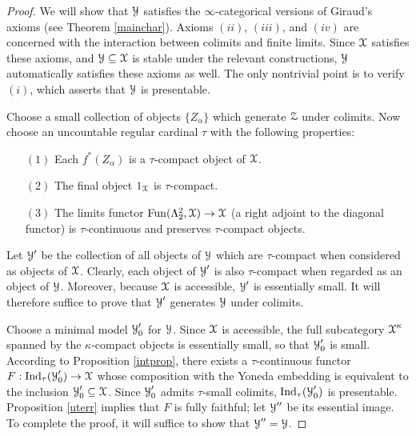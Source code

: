\begin{proof}
We will show that $\operatorname{\mathcal{Y}}$ satisfies the $\infty$-categorical versions of Giraud's axioms (see
Theorem \ref{mainchar}). Axioms $(ii)$, $(iii)$, and $(iv)$ are concerned with the interaction between colimits and finite limits. Since $\operatorname{\mathcal{X}}$ satisfies these axioms, and $\operatorname{\mathcal{Y}} \subseteq \operatorname{\mathcal{X}}$ is stable under the relevant constructions, $\operatorname{\mathcal{Y}}$ automatically satisfies these axioms as well. The only nontrivial point is to verify $(i)$, which asserts that $\operatorname{\mathcal{Y}}$ is presentable. 

Choose a small collection of objects $\{ Z_{\alpha} \}$ which generate $\operatorname{\mathcal{Z}}$ under colimits.
Now choose an uncountable regular cardinal $\tau$ with the following properties:

\begin{itemize}
\item[$(1)$] Each $f^{\ast}(Z_{\alpha})$ is a $\tau$-compact object of $\operatorname{\mathcal{X}}$.
\item[$(2)$] The final object $1_{\operatorname{\mathcal{X}}}$ is $\tau$-compact.
\item[$(3)$] The limits functor $\operatorname{Fun}(\Lambda^2_2, \operatorname{\mathcal{X}}) \rightarrow \operatorname{\mathcal{X}}$
(a right adjoint to the diagonal functor) is $\tau$-continuous and preserves $\tau$-compact objects.
\end{itemize}

Let $\operatorname{\mathcal{Y}}'$ be the collection of all objects of $\operatorname{\mathcal{Y}}$ which are $\tau$-compact when considered as objects of $\operatorname{\mathcal{X}}$. Clearly, each object of $\operatorname{\mathcal{Y}}'$ is also $\tau$-compact when regarded as an object of $\operatorname{\mathcal{Y}}$. Moreover, because $\operatorname{\mathcal{X}}$ is accessible, $\operatorname{\mathcal{Y}}'$ is essentially small. It will therefore suffice to prove that $\operatorname{\mathcal{Y}}'$ generates $\operatorname{\mathcal{Y}}$ under colimits.

Choose a minimal model $\operatorname{\mathcal{Y}}'_0$ for $\operatorname{\mathcal{Y}}$. Since $\operatorname{\mathcal{X}}$ is accessible, the full subcategory $\operatorname{\mathcal{X}}^{\kappa}$ spanned by the $\kappa$-compact objects is essentially small, so that $\operatorname{\mathcal{Y}}'_0$ is small. According to Proposition \ref{intprop}, there exists a $\tau$-continuous functor
$F: \operatorname{Ind}_{\tau}( \operatorname{\mathcal{Y}}'_{0} ) \rightarrow \operatorname{\mathcal{X}}$ whose composition with the Yoneda embedding
is equivalent to the inclusion $\operatorname{\mathcal{Y}}'_0 \subseteq \operatorname{\mathcal{X}}$. Since $\operatorname{\mathcal{Y}}'_0$ admits $\tau$-small colimits, $\operatorname{Ind}_{\tau}( \operatorname{\mathcal{Y}}'_{0} )$ is presentable.
Proposition \ref{uterr} implies that $F$ is fully faithful; let $\operatorname{\mathcal{Y}}''$ be its essential image. To complete the proof, it will suffice to show that $\operatorname{\mathcal{Y}}'' = \operatorname{\mathcal{Y}}$. 


\end{proof}
